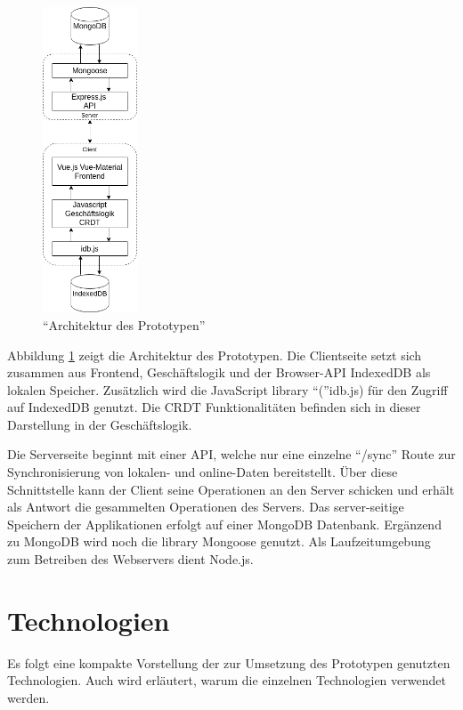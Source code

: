 \documentclass[a4paper, 12pt]{scrreprt}
\begin{document}
\begin{figure}[h]
	\centering
	\includegraphics[width=0.25\textwidth]{architektur.png}
	\caption{\enquote{Architektur des Prototypen}}
	\label{fig:architektur}
\end{figure}

Abbildung \ref{fig:architektur} zeigt die Architektur des Prototypen. Die Clientseite setzt sich zusammen aus Frontend, Geschäftslogik und der Browser-API IndexedDB als lokalen Speicher. Zusätzlich wird die JavaScript library \enquote(idb.js) für den Zugriff auf IndexedDB genutzt. Die CRDT Funktionalitäten befinden sich in dieser Darstellung in der Geschäftslogik. 

Die Serverseite beginnt mit einer API, welche nur eine einzelne \enquote{/sync} Route zur Synchronisierung von lokalen- und online-Daten bereitstellt. Über diese Schnittstelle kann der Client seine Operationen an den Server schicken und erhält als Antwort die gesammelten Operationen des Servers. Das server-seitige Speichern der Applikationen erfolgt auf einer MongoDB Datenbank. Ergänzend zu MongoDB wird noch die library Mongoose genutzt. Als Laufzeitumgebung zum Betreiben des Webservers dient Node.js.

\section{Technologien}

Es folgt eine kompakte Vorstellung der zur Umsetzung des Prototypen genutzten Technologien. Auch wird erläutert, warum die einzelnen Technologien verwendet werden.
\end{document}
